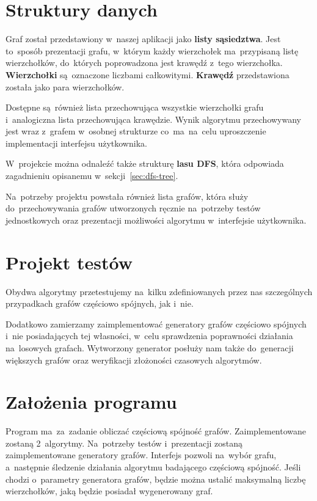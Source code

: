 \documentclass[a4paper,12pt]{mwart}
\begin{document}
\section{Struktury danych}

Graf został przedstawiony w~naszej aplikacji jako \textbf{listy sąsiedztwa}.
Jest to~sposób prezentacji grafu, w~którym każdy wierzchołek ma~przypisaną
listę wierzchołków, do~których poprowadzona jest krawędź z~tego wierzchołka.
\textbf{Wierzchołki} są~oznaczone liczbami całkowitymi. \textbf{Krawędź}
przedstawiona została jako para wierzchołków.

Dostępne są~również lista przechowująca wszystkie wierzchołki grafu
i~analogiczna lista przechowująca krawędzie. Wynik algorytmu przechowywany jest
wraz z~grafem w~osobnej strukturze co~ma~na~celu uproszczenie implementacji
interfejsu użytkownika.

W~projekcie można odnaleźć także strukturę \textbf{lasu DFS}, która odpowiada
zagadnieniu opisanemu w~sekcji~\ref{sec:dfs-tree}.

Na~potrzeby projektu powstała również lista grafów, która służy
do~przechowywania grafów utworzonych ręcznie na~potrzeby testów jednostkowych
oraz prezentacji możliwości algorytmu w~interfejsie użytkownika.

\section{Projekt testów}

Obydwa algorytmy przetestujemy na~kilku zdefiniowanych przez nas szczególnych
przypadkach grafów częściowo spójnych, jak i~nie.

Dodatkowo zamierzamy zaimplementować generatory grafów częściowo spójnych i~nie
posiadających tej własności, w~celu sprawdzenia poprawności działania
na~losowych grafach. Wytworzony generator posłuży nam także do~generacji
większych grafów oraz weryfikacji złożoności czasowych algorytmów.

\section{Założenia programu}

Program ma~za~zadanie obliczać częściową spójność grafów. Zaimplementowane
zostaną 2~algorytmy. Na~potrzeby testów i~prezentacji zostaną zaimplementowane
generatory grafów. Interfejs pozwoli na~wybór grafu, a~następnie śledzenie
działania algorytmu badającego częściową spójność. Jeśli chodzi o~parametry
generatora grafów, będzie można ustalić maksymalną liczbę wierzchołków, jaką
będzie posiadał wygenerowany graf.
\end{document}
